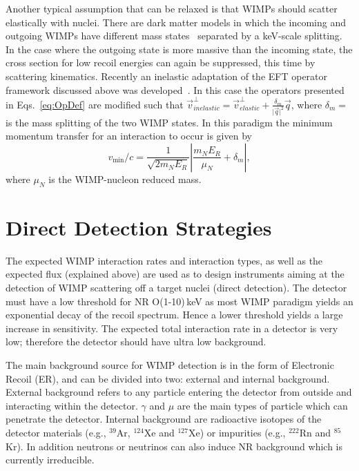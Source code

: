 	    Another typical assumption that can be relaxed is that WIMPs should scatter elastically with nuclei. There are dark matter models in which the incoming and outgoing WIMPs have different mass states~\cite{InelasticIntro} separated by a keV-scale splitting. In the case where the outgoing state is more massive than the incoming state, the cross section for low recoil energies can again be suppressed, this time by scattering kinematics. Recently an inelastic adaptation of the EFT operator framework discussed above was developed~\cite{InelasticMath}. In this case the operators presented in Eqs.~\ref{eq:OpDef} are modified such that $\vec{v}^{\perp}_{inelastic} = \vec{v}^{\perp}_{elastic} +\frac{\delta_m}{\vert{\vec{q}}\vert^2}\vec{q}$, where $\delta_m = $ is the mass splitting of the two WIMP states. In this paradigm the minimum momentum transfer for an interaction to occur is given by
\begin{equation}
  v_\mathrm{min}/c = \frac{1}{\sqrt{2 m_N E_R}} \left|\frac{m_N E_R}{\mu_N} + \delta_m\right|,
\end{equation}
where $\mu_N$ is the WIMP-nucleon reduced mass.



\section{Direct Detection Strategies}
\label{sec:detStrtegies}

The expected WIMP interaction rates and interaction types, as well as the expected flux (explained above) are used as to design instruments aiming at the detection of WIMP scattering off a target nuclei (direct detection). The detector must have a low threshold for NR O(1-10)\,keV as most WIMP paradigm yields an exponential decay of the recoil spectrum. Hence a lower threshold yields a large increase in sensitivity. The expected total interaction rate in a detector is very low; therefore the detector should have ultra low background.


The main background source for WIMP detection is in the form of Electronic Recoil (ER), and can be divided into two: external and internal background. External background refers to any particle entering the detector from outside and interacting within the detector. $\gamma$ and $\mu$ are the main types of particle which can penetrate the detector. Internal background are radioactive isotopes of the detector materials (e.g., $^{39}$Ar, $^{124}$Xe and $^{127}$Xe) or impurities (e.g., $^{222}$Rn and $^{85}$Kr).
In addition neutrons or neutrinos can also induce NR background which is currently irreducible. 


